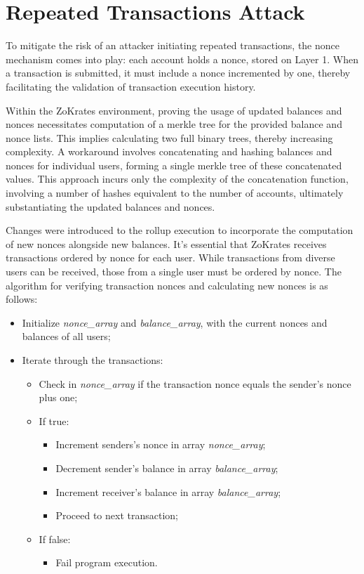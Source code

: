 \section{Repeated Transactions Attack}
\label{sec:repeatedtransactionsattack}

To mitigate the risk of an attacker initiating repeated transactions, the nonce mechanism comes into play: each account holds a nonce, stored on Layer 1. When a transaction is submitted, it must include a nonce incremented by one, thereby facilitating the validation of transaction execution history.

Within the ZoKrates environment, proving the usage of updated balances and nonces necessitates computation of a merkle tree for the provided balance and nonce lists. This implies calculating two full binary trees, thereby increasing complexity. A workaround involves concatenating and hashing balances and nonces for individual users, forming a single merkle tree of these concatenated values. This approach incurs only the complexity of the concatenation function, involving a number of hashes equivalent to the number of accounts, ultimately substantiating the updated balances and nonces.

Changes were introduced to the rollup execution to incorporate the computation of new nonces alongside new balances. It's essential that ZoKrates receives transactions ordered by nonce for each user. While transactions from diverse users can be received, those from a single user must be ordered by nonce. The algorithm for verifying transaction nonces and calculating new nonces is as follows:
\begin{itemize}
	\item Initialize \textit{nonce\_array} and \textit{balance\_array}, with the current nonces and balances of all users;
	\item Iterate through the transactions:
	\begin{itemize}
		\item Check in \textit{nonce\_array} if the transaction nonce equals the sender's nonce plus one;
		\item If true:
		\begin{itemize}
			\item Increment senders's nonce in array \textit{nonce\_array};
			\item Decrement sender's balance in array \textit{balance\_array};
			\item Increment receiver's balance in array \textit{balance\_array};
			\item Proceed to next transaction;
		\end{itemize}
		\item If false:
		\begin{itemize}
			\item Fail program execution.
		\end{itemize}
    \end{itemize}
\end{itemize}

